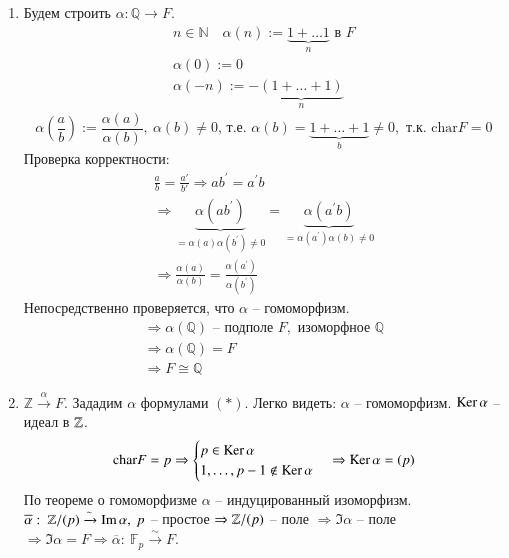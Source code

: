 \documentclass[main]{subfiles}
\begin{document}
\begin{longProof}
    \begin{enumerate}
        \item Будем строить $\alpha: \mathbb{Q} \rightarrow F$.
        \[\left. \begin{gathered}
         n \in \mathbb{N} \quad \alpha(n) := \underbrace{1 + \ldots 1}_n \text{ в } F \\
            \alpha(0) := 0 \\
            \alpha(-n) := -\underbrace{(1 + \ldots + 1)}_n 
        \end{gathered}
        \right. \tag*{(*)} \]
        \[\alpha \left(  \frac{a}{b} \right) := \frac{\alpha(a)}{\alpha(b)}, \ \alpha(b) \ne 0 
        \text{, т.е. } \alpha(b) = \underbrace{1 + \ldots + 1}_b \neq 0, \text{ т.к. } \text{char} F = 0\]
        Проверка корректности:
        \begin{gather*}  
            \frac{a}{b} = \frac{a\prime}{b\prime} \Rightarrow ab^\prime = a^\prime b \\
            \Rightarrow \underbrace{\alpha(a b^\prime)}_{=\alpha(a)\alpha(b^\prime) \ne 0}
             = \underbrace{\alpha(a^\prime b)}_{=\alpha(a^\prime)\alpha(b) \ne 0} \\
            \Rightarrow \frac{\alpha(a)}{\alpha(b)} = 
            \frac{\alpha(a^\prime)}{\alpha(b^\prime)} 
        \end{gather*}
        Непосредственно проверяется, что $\alpha$ -- гомоморфизм.
        \begin{gather*}
            \Rightarrow \alpha(\mathbb{Q}) \text{ -- подполе } F, \text{ изоморфное } \mathbb{Q}\\
            \Rightarrow \alpha(\mathbb{Q}) = F \\
            \Rightarrow F \cong \mathbb{Q}
        \end{gather*}
        \item
         $\mathbb{Z} \stackrel{\alpha}{\longrightarrow} F$. Зададим $\alpha$ формулами $(*)$. Легко видеть:
        $ \alpha $ -- гомоморфизм. $\operatorname{Ker} \alpha$ -- идеал в $\mathbb{Z}$.
        \begin{gather*}
            \text{char} F = p \Rightarrow \begin{cases}
                p \in \operatorname{Ker} \alpha \\
                1, \ldots, p-1 \notin \operatorname{Ker} \alpha
            \end{cases} \Rightarrow \operatorname{Ker} \alpha = (p)
        \end{gather*}
        По теореме о гомоморфизме $\alpha$ -- индуцированный изоморфизм. $\overline{\alpha}: \ \mathbb{Z} / (p) 
        \xrightarrow{\sim} \operatorname{Im} \alpha, \ p$ -- простое $\Rightarrow \mathbb{Z} / (p) $ -- поле 
            $\Rightarrow \Im \alpha$ -- поле
            $\Rightarrow \Im \alpha = F \Rightarrow
            \overline{\alpha}: \ \mathbb{F}_p \xrightarrow{\sim} F$.
    \end{enumerate}
\end{longProof}
\end{document}
